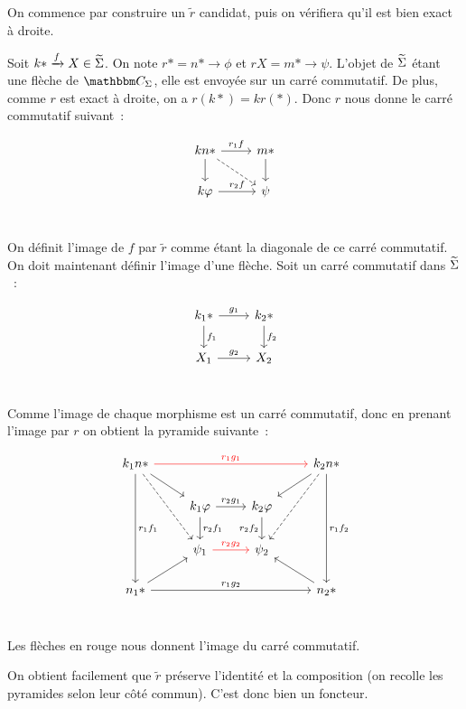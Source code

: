 \begin{pv}
    On commence par construire un $\tilde{r}$ candidat, puis on
    vérifiera qu'il est bien exact à droite.
    
    Soit $k\ast\xrightarrow{f} X\in\widetilde{\Sigma}$. On note $r\ast = n\ast\rightarrow\phi$
    et $rX = m\ast\rightarrow\psi$. L'objet de $\widetilde{\Sigma}$ étant une flèche de $\C_\Sigma$,
    elle est envoyée sur un carré commutatif. De plus, comme $r$ est exact à droite,
    on a $r(k\ast) = kr(\ast)$. Donc $r$ nous donne le carré commutatif suivant~:

    \[\begin{tikzcd}
        kn\ast\arrow[r, "r_1f"]\arrow[d]\arrow[dr,dashed] & m\ast\arrow[d] \\
        k\phi\arrow[r, "r_2f"] & \psi \\
    \end{tikzcd}\]

    On définit l'image de $f$ par $\tilde{r}$ comme étant la diagonale de ce carré
    commutatif. On doit maintenant définir l'image d'une flèche. Soit un carré commutatif
    dans $\widetilde{\Sigma}$~:

    \[\begin{tikzcd}
        k_1\ast\arrow[r,"g_1"]\arrow[d,"f_1"] & k_2\ast\arrow[d,"f_2"] \\
        X_1\arrow[r,"g_2"] & X_2 \\
    \end{tikzcd}\]

    Comme l'image de chaque morphisme est un carré commutatif, donc en prenant
    l'image par $r$ on obtient la pyramide suivante~:

    \[\begin{tikzcd}
        k_1n\ast\arrow[rrr,red,"r_1g_1"]\arrow[dr]\arrow[ddd, "r_1f_1"]\arrow[ddr,dashed]
            & & & k_2n\ast\arrow[dl]\arrow[ddd, "r_1f_2"]\arrow[ddl,dashed] \\
        & k_1\phi\arrow[r,"r_2g_1"]\arrow[d,"r_2f_1"]
            & k_2\phi\arrow[d,swap,"r_2f_2"] & \\
        & \psi_1\arrow[r,red,"r_2g_2"]
            & \psi_2 & \\
        n_1\ast\arrow[ur]\arrow[rrr,"r_1g_2"]
            & & & n_2\ast\arrow[ul] \\
    \end{tikzcd}\]

    Les flèches en rouge nous donnent l'image du carré commutatif.

    On obtient facilement que $\tilde{r}$ préserve l'identité et la composition
    (on recolle les pyramides selon leur côté commun). C'est donc bien un foncteur.


\end{pv}
